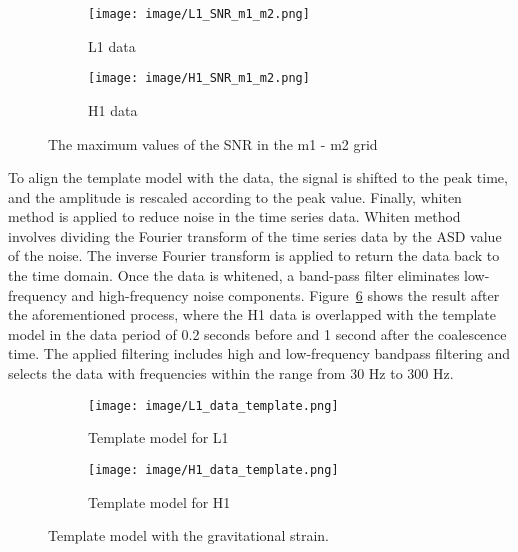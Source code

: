 \documentclass[11pt, letterpaper]{article}
\begin{document}
\begin{figure}[htbp]
  \centering
  \begin{subfigure}[b]{0.45\textwidth}
    \centering
    \texttt{[image: image/L1\_SNR\_m1\_m2.png]}
    \caption{L1 data}
    \label{fig:figure1}
  \end{subfigure}
  \hfill
  \begin{subfigure}[b]{0.45\textwidth}
    \centering
    \texttt{[image: image/H1\_SNR\_m1\_m2.png]}
    \caption{H1 data}
    \label{fig:figure2}
  \end{subfigure}
  \caption{The maximum values of the SNR in the m1 - m2 grid}
  \label{fig:m1_m2_grid}
\end{figure}

To align the template model with the data, the signal is shifted to the peak time, and the amplitude is rescaled according to the peak value. Finally, whiten method is applied to reduce noise in the time series data. Whiten method involves dividing the Fourier transform of the time series data by the ASD value of the noise. The inverse Fourier transform is applied to return the data back to the time domain. Once the data is whitened, a band-pass filter eliminates low-frequency and high-frequency noise components. Figure~\ref{fig:whiten} shows the result after the aforementioned process, where the H1 data is overlapped with the template model in the data period of 0.2 seconds before and 1 second after the coalescence time. The applied filtering includes high and low-frequency bandpass filtering and selects the data with frequencies within the range from 30 Hz to 300 Hz.

\begin{figure}[htbp]
  \centering
  \begin{subfigure}[b]{0.45\textwidth}
    \centering
    \texttt{[image: image/L1\_data\_template.png]}
    \caption{Template model for L1}
    \label{fig:figure1}
  \end{subfigure}
  \hfill
  \begin{subfigure}[b]{0.45\textwidth}
    \centering
    \texttt{[image: image/H1\_data\_template.png]}
    \caption{Template model for H1}
    \label{fig:figure2}
  \end{subfigure}
  \caption{Template model with the gravitational strain.}
  \label{fig:whiten}
\end{figure}


\end{document}

